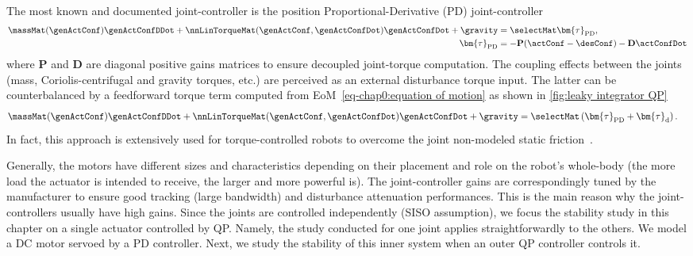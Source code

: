 The most known and documented joint-controller is the position Proportional-Derivative (PD) joint-controller~\cite{spong2020bookRobotModeling,siciliano2010robotics}
\begin{align}
	\massMat(\genActConf) \genActConfDDot + \nnLinTorqueMat(\genActConf,\genActConfDot)\genActConfDot + \gravity&= \selectMat\bm{\tau}_{\rm PD}, \\
	\bm{\tau}_{\rm PD} &= -\mathbf{P}(\actConf - \desConf) - \mathbf{D}\actConfDot
\end{align}
where $\mathbf{P}$ and $\mathbf{D}$ are diagonal positive gains matrices to ensure decoupled joint-torque computation. 
 The coupling effects between the joints (mass, Coriolis-centrifugal and gravity torques, etc.) are perceived as an external disturbance torque input. The latter can be counterbalanced by a feedforward torque term computed from EoM~\eqref{eq-chap0:equation of motion} as shown in \cref{fig:leaky integrator QP} 
 \begin{align}
 	\massMat(\genActConf) \genActConfDDot + \nnLinTorqueMat(\genActConf,\genActConfDot)\genActConfDot +\gravity&= \selectMat\left(\bm{\tau}_{\rm PD} + \bm{\tau}_{\rm d}\right). 
 \end{align}
 In fact, this approach is extensively used for torque-controlled robots to overcome the joint non-modeled static friction~\cite{hopkins2015icra,hopkins2015iros,cisneros2018iros,kuindersma2016autonomousRobot,koolen2016ijhr,hopkins2015icra}.   

Generally, the motors have different sizes and characteristics depending on their placement and role on the robot's whole-body (the more load the actuator is intended to receive, the larger and more powerful is). The joint-controller gains are correspondingly tuned by the manufacturer to ensure good tracking (large bandwidth) and disturbance attenuation performances. This is the main reason why the joint-controllers usually have high gains. 
Since the joints are controlled independently (SISO assumption), we focus the stability study in this chapter on a single actuator controlled by QP. Namely, the study conducted for one joint applies straightforwardly to the others.  
We model a DC motor servoed by a PD controller. Next, we study the stability of this inner system when an outer QP controller controls it. 

